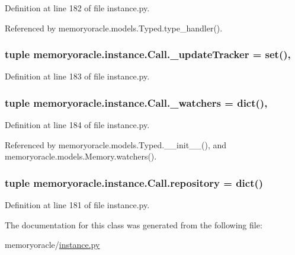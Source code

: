 Definition at line 182 of file instance.\+py.



Referenced by memoryoracle.\+models.\+Typed.\+type\+\_\+handler().

\hypertarget{classmemoryoracle_1_1instance_1_1Call_a21a428f75b5e01781715644c36667ba1}{}
\subsubsection[{\+\_\+update\+Tracker}]{\setlength{\rightskip}{0pt plus 5cm}tuple memoryoracle.\+instance.\+Call.\+\_\+update\+Tracker = set()\hspace{0.3cm}{\ttfamily [static]}, {\ttfamily [private]}}\label{classmemoryoracle_1_1instance_1_1Call_a21a428f75b5e01781715644c36667ba1}


Definition at line 183 of file instance.\+py.

\hypertarget{classmemoryoracle_1_1instance_1_1Call_a5584ef8567d815a51e59216116b0c70c}{}
\subsubsection[{\+\_\+watchers}]{\setlength{\rightskip}{0pt plus 5cm}tuple memoryoracle.\+instance.\+Call.\+\_\+watchers = dict()\hspace{0.3cm}{\ttfamily [static]}, {\ttfamily [private]}}\label{classmemoryoracle_1_1instance_1_1Call_a5584ef8567d815a51e59216116b0c70c}


Definition at line 184 of file instance.\+py.



Referenced by memoryoracle.\+models.\+Typed.\+\_\+\+\_\+init\+\_\+\+\_\+(), and memoryoracle.\+models.\+Memory.\+watchers().

\hypertarget{classmemoryoracle_1_1instance_1_1Call_a8dc27177c9f423bd7127478c9865208a}{}
\subsubsection[{repository}]{\setlength{\rightskip}{0pt plus 5cm}tuple memoryoracle.\+instance.\+Call.\+repository = dict()\hspace{0.3cm}{\ttfamily [static]}}\label{classmemoryoracle_1_1instance_1_1Call_a8dc27177c9f423bd7127478c9865208a}


Definition at line 181 of file instance.\+py.



The documentation for this class was generated from the following file\+:\begin{DoxyCompactItemize}
\item 
memoryoracle/\hyperlink{instance_8py}{instance.\+py}\end{DoxyCompactItemize}
